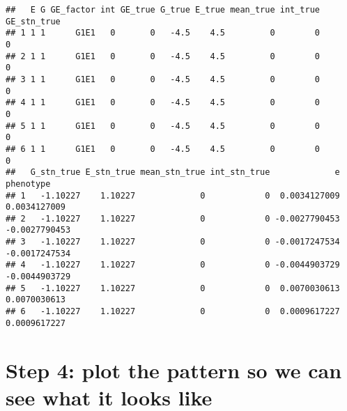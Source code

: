 \documentclass[]{article}
\begin{document}
\begin{verbatim}
##   E G GE_factor int GE_true G_true E_true mean_true int_true GE_stn_true
## 1 1 1      G1E1   0       0   -4.5    4.5         0        0           0
## 2 1 1      G1E1   0       0   -4.5    4.5         0        0           0
## 3 1 1      G1E1   0       0   -4.5    4.5         0        0           0
## 4 1 1      G1E1   0       0   -4.5    4.5         0        0           0
## 5 1 1      G1E1   0       0   -4.5    4.5         0        0           0
## 6 1 1      G1E1   0       0   -4.5    4.5         0        0           0
##   G_stn_true E_stn_true mean_stn_true int_stn_true             e     phenotype
## 1   -1.10227    1.10227             0            0  0.0034127009  0.0034127009
## 2   -1.10227    1.10227             0            0 -0.0027790453 -0.0027790453
## 3   -1.10227    1.10227             0            0 -0.0017247534 -0.0017247534
## 4   -1.10227    1.10227             0            0 -0.0044903729 -0.0044903729
## 5   -1.10227    1.10227             0            0  0.0070030613  0.0070030613
## 6   -1.10227    1.10227             0            0  0.0009617227  0.0009617227
\end{verbatim}

\hypertarget{step-4-plot-the-pattern-so-we-can-see-what-it-looks-like}{%
\section{Step 4: plot the pattern so we can see what it looks
like}\label{step-4-plot-the-pattern-so-we-can-see-what-it-looks-like}}
\end{document}
